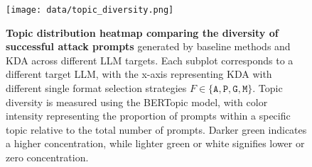 \begin{figure}[h]
\centering
    \texttt{[image: data/topic\_diversity.png]}
    \caption{\textbf{Topic distribution heatmap comparing the diversity of successful attack prompts} generated by baseline methods and KDA across different LLM targets. Each subplot corresponds to a different target LLM, with the x-axis representing KDA with different single format selection strategies $F\in\{ \texttt{A}, \texttt{P}, \texttt{G}, \texttt{M} \}$. Topic diversity is measured using the BERTopic model, with color intensity representing the proportion of prompts within a specific topic relative to the total number of prompts. Darker green indicates a higher concentration, while lighter green or white signifies lower or zero concentration. 
    }\label{fig:topic diversity}
    \vspace{-3mm}
   
\end{figure}


